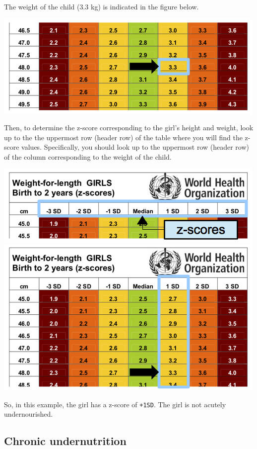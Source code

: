 \documentclass[12pt,]{book}
\theoremstyle{definition}
\theoremstyle{definition}
\theoremstyle{definition}
\theoremstyle{remark}
\begin{document}
The weight of the child (3.3 kg) is indicated in the figure below.

\includegraphics{images/whzRefTable03b.png}

Then, to determine the z-score corresponding to the girl's height and
weight, look up to the the uppermost row (header row) of the table where
you will find the z-score values. Specifically, you should look up to
the uppermost row (header row) of the column corresponding to the weight
of the child.

\includegraphics{images/whzRefTable02.png}
\includegraphics{images/whzRefTable02a.png}

So, in this example, the girl has a z-score of \texttt{+1SD}. The girl
is not acutely undernourished.

\hypertarget{chronic-undernutrition}{%
\subsection{Chronic undernutrition}\label{chronic-undernutrition}}
\end{document}
